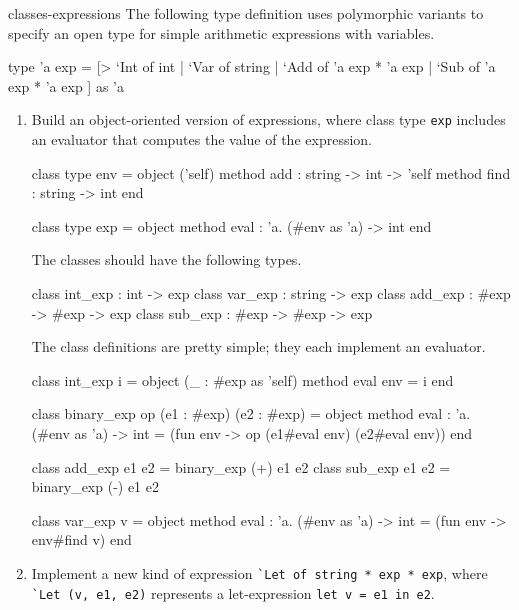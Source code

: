 %
\begin{exercise}{classes-expressions}
The following type definition uses polymorphic variants to specify an open type for simple
arithmetic expressions with variables.

\begin{ocaml}
type 'a exp =
 [> `Int of int
  | `Var of string
  | `Add of 'a exp * 'a exp
  | `Sub of 'a exp * 'a exp ] as 'a
\end{ocaml}
%
\begin{enumerate}
\item
Build an object-oriented version of expressions, where class type \hbox{\lstinline/exp/} includes an
evaluator that computes the value of the expression.

\begin{ocaml}
class type env =
object ('self)
   method add : string -> int -> 'self
   method find : string -> int
end

class type exp =
object
   method eval : 'a. (#env as 'a) -> int
end
\end{ocaml}
%
The classes should have the following types.

\begin{ocaml}
class int_exp : int -> exp
class var_exp : string -> exp
class add_exp : #exp -> #exp -> exp
class sub_exp : #exp -> #exp -> exp
\end{ocaml}

\begin{answer}\ifanswers
The class definitions are pretty simple; they each implement an evaluator.

\begin{ocaml}
class int_exp i =
object (_ : #exp as 'self)
   method eval env = i
end

class binary_exp op (e1 : #exp) (e2 : #exp) =
object
   method eval : 'a. (#env as 'a) -> int =
      (fun env -> op (e1#eval env) (e2#eval env))
end

class add_exp e1 e2 = binary_exp (+) e1 e2
class sub_exp e1 e2 = binary_exp (-) e1 e2

class var_exp v =
object
   method eval : 'a. (#env as 'a) -> int = (fun env -> env#find v)
end
\end{ocaml}
\fi\end{answer}

\item

Implement a new kind of expression \hbox{\lstinline/`Let of string * exp * exp/},
where \hbox{\lstinline/`Let (v, e1, e2)/} represents a let-expression
\hbox{\lstinline/let v = e1 in e2/}.


\end{enumerate}
\end{exercise}

